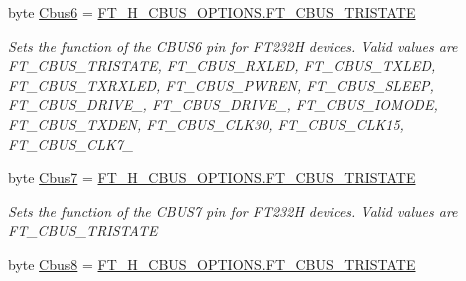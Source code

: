 \begin{DoxyCompactItemize}
byte \mbox{\hyperlink{class_f_t_d2_x_x___n_e_t_1_1_f_t_d_i_1_1_f_t232_h___e_e_p_r_o_m___s_t_r_u_c_t_u_r_e_a6221ba9a8bd1ce1c0b6bc0771e0b7c4b}{Cbus6}} = \mbox{\hyperlink{class_f_t_d2_x_x___n_e_t_1_1_f_t_d_i_1_1_f_t__232_h___c_b_u_s___o_p_t_i_o_n_s_a87f6bc339ec2e6bbb3ad093eb9d38278}{F\+T\+\_\+H\+\_\+\+C\+B\+U\+S\+\_\+\+O\+P\+T\+I\+O\+N\+S.\+F\+T\+\_\+\+C\+B\+U\+S\+\_\+\+T\+R\+I\+S\+T\+A\+TE}}
\begin{DoxyCompactList}\small\item\em Sets the function of the C\+B\+U\+S6 pin for F\+T232H devices. Valid values are F\+T\+\_\+\+C\+B\+U\+S\+\_\+\+T\+R\+I\+S\+T\+A\+TE, F\+T\+\_\+\+C\+B\+U\+S\+\_\+\+R\+X\+L\+ED, F\+T\+\_\+\+C\+B\+U\+S\+\_\+\+T\+X\+L\+ED, F\+T\+\_\+\+C\+B\+U\+S\+\_\+\+T\+X\+R\+X\+L\+ED, F\+T\+\_\+\+C\+B\+U\+S\+\_\+\+P\+W\+R\+EN, F\+T\+\_\+\+C\+B\+U\+S\+\_\+\+S\+L\+E\+EP, F\+T\+\_\+\+C\+B\+U\+S\+\_\+\+D\+R\+I\+V\+E\+\_, F\+T\+\_\+\+C\+B\+U\+S\+\_\+\+D\+R\+I\+V\+E\+\_, F\+T\+\_\+\+C\+B\+U\+S\+\_\+\+I\+O\+M\+O\+DE, F\+T\+\_\+\+C\+B\+U\+S\+\_\+\+T\+X\+D\+EN, F\+T\+\_\+\+C\+B\+U\+S\+\_\+\+C\+L\+K30, F\+T\+\_\+\+C\+B\+U\+S\+\_\+\+C\+L\+K15, F\+T\+\_\+\+C\+B\+U\+S\+\_\+\+C\+L\+K7\+\_ \end{DoxyCompactList}\item 
byte \mbox{\hyperlink{class_f_t_d2_x_x___n_e_t_1_1_f_t_d_i_1_1_f_t232_h___e_e_p_r_o_m___s_t_r_u_c_t_u_r_e_acf77d77fd673c96ed77b8a0f0be968d3}{Cbus7}} = \mbox{\hyperlink{class_f_t_d2_x_x___n_e_t_1_1_f_t_d_i_1_1_f_t__232_h___c_b_u_s___o_p_t_i_o_n_s_a87f6bc339ec2e6bbb3ad093eb9d38278}{F\+T\+\_\+H\+\_\+\+C\+B\+U\+S\+\_\+\+O\+P\+T\+I\+O\+N\+S.\+F\+T\+\_\+\+C\+B\+U\+S\+\_\+\+T\+R\+I\+S\+T\+A\+TE}}
\begin{DoxyCompactList}\small\item\em Sets the function of the C\+B\+U\+S7 pin for F\+T232H devices. Valid values are F\+T\+\_\+\+C\+B\+U\+S\+\_\+\+T\+R\+I\+S\+T\+A\+TE \end{DoxyCompactList}\item 
byte \mbox{\hyperlink{class_f_t_d2_x_x___n_e_t_1_1_f_t_d_i_1_1_f_t232_h___e_e_p_r_o_m___s_t_r_u_c_t_u_r_e_ad9a7fece770fb61234bb3027946ac949}{Cbus8}} = \mbox{\hyperlink{class_f_t_d2_x_x___n_e_t_1_1_f_t_d_i_1_1_f_t__232_h___c_b_u_s___o_p_t_i_o_n_s_a87f6bc339ec2e6bbb3ad093eb9d38278}{F\+T\+\_\+H\+\_\+\+C\+B\+U\+S\+\_\+\+O\+P\+T\+I\+O\+N\+S.\+F\+T\+\_\+\+C\+B\+U\+S\+\_\+\+T\+R\+I\+S\+T\+A\+TE}}

\end{DoxyCompactItemize}
